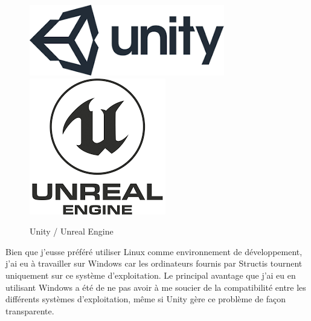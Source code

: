 \documentclass[a4paper]{article}
\begin{document}
    \begin{figure}[H]
        \centering
        \includegraphics[scale=0.35]{img/logo-unity}
        \hspace{10pt}
        \includegraphics[scale=0.35]{img/logo-unreal}
        \caption{Unity / Unreal Engine}
    \end{figure}

    \vfill

    Bien que j'eusse préféré utiliser Linux comme environnement de développement, j'ai eu à travailler sur Windows car les ordinateurs fournis par Structis tournent uniquement sur ce système d'exploitation. Le principal avantage que j'ai eu en utilisant Windows a été de ne pas avoir à me soucier de la compatibilité entre les différents systèmes d'exploitation, même si Unity gère ce problème de façon transparente. \\
\end{document}
